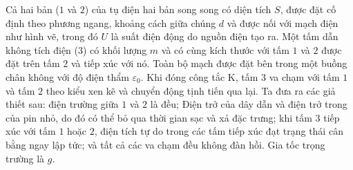     \begin{vd}
Cả hai bản ($1$ và $2$) của tụ điện hai bản song song có diện tích $S$, được đặt cố định theo phương ngang, khoảng cách giữa chúng $d$ và được nối với mạch điện như hình vẽ, trong đó $U$ là suất điện động do nguồn điện tạo ra. Một tấm dẫn không tích điện ($3$) có khối lượng $m$ và có cùng kích thước với tấm $1$ và $2$ được đặt trên tấm $2$ và tiếp xúc với nó. Toàn bộ mạch được đặt bên trong một buồng chân không với độ điện thẩm $\varepsilon_0$. Khi đóng công tắc K, tấm $3$ va chạm với tấm $1$ và tấm $2$ theo kiểu xen kẽ và chuyển động tịnh tiến qua lại. Ta đưa ra các giả thiết sau: điện trường giữa $1$ và $2$ là đều; Điện trở của dây dẫn và điện trở trong của pin nhỏ, do đó có thể bỏ qua thời gian sạc và xả đặc trưng; khi tấm $3$ tiếp xúc với tấm $1$ hoặc $2$, điện tích tự do trong các tấm tiếp xúc đạt trạng thái cân bằng ngay lập tức; và tất cả các va chạm đều không đàn hồi. Gia tốc trọng trường là $g$.
\begin{center}
    \tikzset{
    pattern size/.store in=\mcSize, 
    pattern size = 5pt,
    pattern thickness/.store in=\mcThickness, 
    pattern thickness = 0.3pt,
    pattern radius/.store in=\mcRadius, 
    pattern radius = 1pt}
    \makeatletter
    \makeatother
    
    \begin{tikzpicture}[x=0.75pt,y=0.75pt,yscale=-0.75,xscale=1]
    

\end{tikzpicture}
\end{center}
\end{vd}
